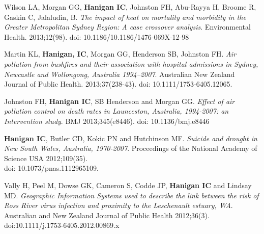 \documentclass[a4paper,11pt]{article}
\begin{document}
\normalsize

 
\renewcommand{\labelenumi}{\textsc{a}\theenumi.}
\begin{revnumerate}

\item Wilson LA, Morgan GG, \textbf{Hanigan IC}, Johnston FH, Abu-Rayya H, Broome R, Gaskin C, Jalaludin, B. \emph{The impact of heat on mortality and morbidity in the Greater Metropolitan Sydney Region: A case crossover analysis}.  Environmental Health. 2013;12(98). doi: 10.1186/10.1186/1476-069X-12-98

\item Martin KL, \textbf{Hanigan, IC}, Morgan GG, Henderson SB, Johnston FH. \emph{Air pollution from bushfires and their association with hospital admissions in Sydney, Newcastle and Wollongong, Australia 1994–2007}. Australian New Zealand Journal of Public Health. 2013;37(238-43). doi: 10.1111/1753-6405.12065.


\item Johnston FH, \textbf{Hanigan IC}, SB Henderson and Morgan GG. \emph{Effect of air pollution control on death rates in Launceston, Australia, 1994-2007: an Intervention study}.  BMJ 2013;345(e8446). doi: 10.1136/bmj.e8446

\item \textbf{Hanigan IC}, Butler CD, Kokic PN and Hutchinson MF. \emph{Suicide and drought in New South Wales, Australia, 1970-2007}.  Proceedings of the National Academy of Science USA 2012;109(35).\\
doi: 10.1073/pnas.1112965109.

\item  Vally H, Peel M, Dowse GK, Cameron S, Codde JP, \textbf{Hanigan IC} and Lindsay MD. \emph{Geographic Information Systems used to describe the link between the risk of Ross River virus infection and proximity to the Leschenault estuary, WA}. Australian and New Zealand Journal of Public Health 2012;36(3). doi:10.1111/j.1753-6405.2012.00869.x


\end{revnumerate}
\end{document}
